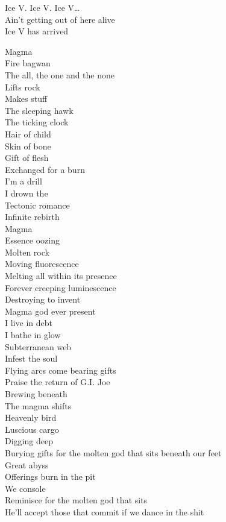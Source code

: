 Ice V. Ice V. Ice V…\\

Ain't getting out of here alive\\
Ice V has arrived\\




Magma\\
Fire bagwan\\
The all, the one and the none\\
Lifts rock\\
Makes stuff\\
The sleeping hawk\\
The ticking clock\\
Hair of child\\
Skin of bone\\
Gift of flesh\\
Exchanged for a burn\\
I'm a drill\\
I drown the \\
Tectonic romance\\
Infinite rebirth\\
Magma\\
Essence oozing\\
Molten rock\\
Moving fluorescence\\
Melting all within its presence\\
Forever creeping luminescence\\
Destroying to invent\\
Magma god ever present\\
I live in debt\\
I bathe in glow\\
Subterranean web\\
Infest the soul\\
Flying arcs come bearing gifts\\
Praise the return of G.I. Joe\\
Brewing beneath\\
The magma shifts\\
Heavenly bird\\
Luscious cargo\\
Digging deep\\
Burying gifts for the molten god that sits beneath our feet\\
Great abyss\\
Offerings burn in the pit\\
We console\\
Reminisce for the molten god that sits\\
He'll accept those that commit if we dance in the shit\\

